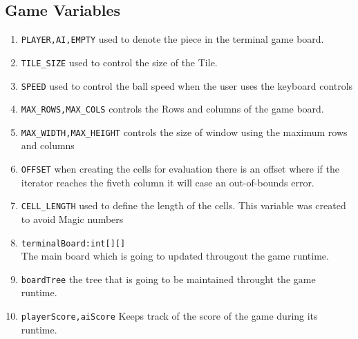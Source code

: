 \documentclass{article}
\begin{document}
\subsection{Game Variables}
\begin{enumerate}
    \item {\small{\verb"PLAYER,AI,EMPTY"} }used to denote the piece in the terminal game board.
    \item {\small{\verb"TILE_SIZE"} }used to control the size of the Tile.
    \item {\small{\verb"SPEED"}} used to control the ball speed when the user uses the keyboard controls
    \item {\small{\verb"MAX_ROWS,MAX_COLS"}} controls the Rows and columns of the game board.
    \item {\small{\verb"MAX_WIDTH,MAX_HEIGHT"}} controls the size of window using the maximum rows and columns
    \item {\small{\verb"OFFSET"}} when creating the cells for evaluation there is an offset where if the iterator reaches the fiveth column it will case an out-of-bounds error.
    \item {\small{\verb"CELL_LENGTH"}} used to define the length of the cells. This variable was created to avoid Magic numbers
    \item {\small{\verb"terminalBoard:int[][]"}}\\ The main board which is going to updated througout the game runtime.
    \item {\small{\verb"boardTree"}} the tree that is going to be maintained throught the game runtime.
    \item {\small{\verb"playerScore,aiScore"}} Keeps track of the score of the game during its runtime.
\end{enumerate}
\end{document}
